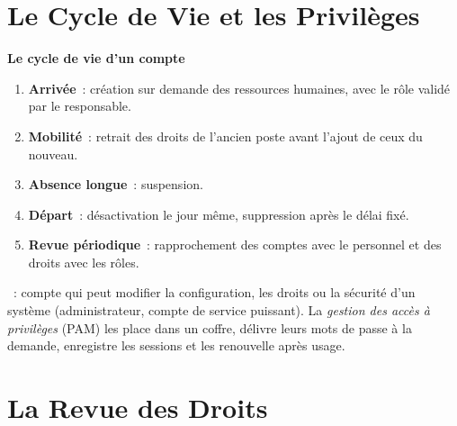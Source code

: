 \section{Le Cycle de Vie et les Privilèges}
\label{sec:c17-cycle}

\begin{boxprocedure}
\textbf{Le cycle de vie d'un compte}
\begin{enumerate}
    \item \textbf{Arrivée}~: création sur demande des ressources humaines,
          avec le rôle validé par le responsable.
    \item \textbf{Mobilité}~: retrait des droits de l'ancien poste avant
          l'ajout de ceux du nouveau.
    \item \textbf{Absence longue}~: suspension.
    \item \textbf{Départ}~: désactivation le jour même, suppression après
          le délai fixé.
    \item \textbf{Revue périodique}~: rapprochement des comptes avec le
          personnel et des droits avec les rôles.
\end{enumerate}
\end{boxprocedure}

\begin{boxdef}
~: compte qui peut modifier la configuration,
les droits ou la sécurité d'un système (administrateur, compte de service
puissant). La \emph{gestion des accès à privilèges} (PAM) les place dans
un coffre, délivre leurs mots de passe à la demande, enregistre les
sessions et les renouvelle après usage.
\end{boxdef}

\section{La Revue des Droits}
\label{sec:c17-revue}

